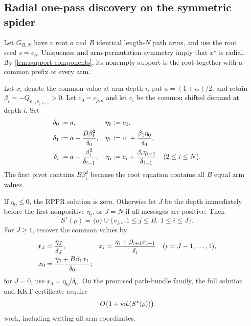 \subsection{Radial one-pass discovery on the symmetric spider}
\label{subsec:spider-schur-discovery}

Let $G_{B,N}$ have a root $o$ and $B$ identical length-$N$ path arms, and use
the root seed $s=e_o$.  Uniqueness and arm-permutation symmetry imply that
$x^\star$ is radial.  By \cref{lem:support-components}, its nonempty support
is the root together with a common prefix of every arm.

Let $x_i$ denote the common value at arm depth $i$, put
$a=(1+\alpha)/2$, and retain
$\beta_i=-Q_{v_{j,i}v_{j,i-1}}>0$.  Let $c_0=c_{\rho,o}$ and let $c_i$ be
the common shifted demand at depth $i$.  Set
\begin{align}
 \delta_0&:=a,
 &\eta_0&:=c_0,
 \notag\\
 \delta_1&:=a-\frac{B\beta_1^2}{\delta_0},
 &\eta_1&:=c_1+\frac{\beta_1\eta_0}{\delta_0},
 \notag\\
 \delta_i&:=a-\frac{\beta_i^2}{\delta_{i-1}},
 &\eta_i&:=c_i+\frac{\beta_i\eta_{i-1}}{\delta_{i-1}}
 \quad(2\leq i\leq N).
 \label{eq:spider-forward-schur}
\end{align}
The first pivot contains $B\beta_1^2$ because the root equation contains all
$B$ equal arm values.

\begin{theorem}
\label{thm:spider-one-pass}
If $\eta_0\leq0$, the RPPR solution is zero.  Otherwise let $J$ be the depth
immediately before the first nonpositive $\eta_i$, or $J=N$ if all messages
are positive.  Then
\begin{equation}
 S^\star(\rho)
 =\{o\}\cup\{v_{j,i}:1\leq j\leq B,\ 1\leq i\leq J\}.
 \label{eq:spider-exact-support}
\end{equation}
For $J\geq1$, recover the common values by
\begin{align}
 x_J&=\frac{\eta_J}{\delta_J},
 &x_i&=\frac{\eta_i+\beta_{i+1}x_{i+1}}{\delta_i}
 \quad(i=J-1,\ldots,1),
 \notag\\
 x_0&=\frac{\eta_0+B\beta_1x_1}{\delta_0};
 \label{eq:spider-back-substitution}
\end{align}
for $J=0$, use $x_0=\eta_0/\delta_0$.  On the promised path-bundle family,
the full solution and KKT certificate require
\begin{equation}
 O\bigl(1+\operatorname{vol}(S^\star(\rho))\bigr)
 \label{eq:spider-output-linear-work}
\end{equation}
work, including writing all arm coordinates.
\end{theorem}

